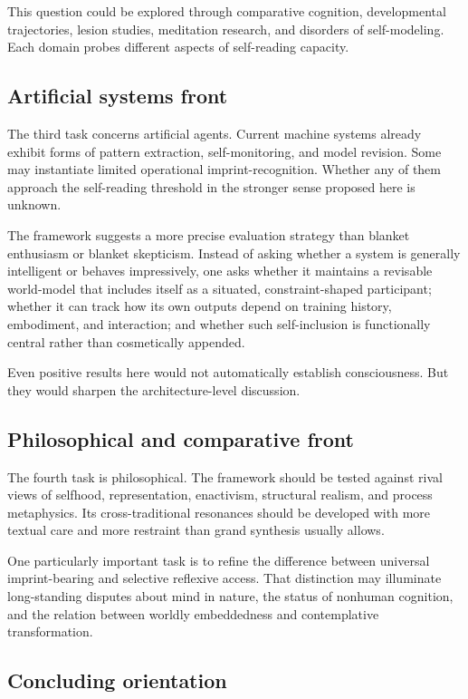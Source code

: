 \documentclass[12pt]{article}
\begin{document}
This question could be explored through comparative cognition, developmental trajectories, lesion studies, meditation research, and disorders of self-modeling. Each domain probes different aspects of self-reading capacity.

\subsection{Artificial systems front}

The third task concerns artificial agents. Current machine systems already exhibit forms of pattern extraction, self-monitoring, and model revision. Some may instantiate limited operational imprint-recognition. Whether any of them approach the self-reading threshold in the stronger sense proposed here is unknown.

The framework suggests a more precise evaluation strategy than blanket enthusiasm or blanket skepticism. Instead of asking whether a system is generally intelligent or behaves impressively, one asks whether it maintains a revisable world-model that includes itself as a situated, constraint-shaped participant; whether it can track how its own outputs depend on training history, embodiment, and interaction; and whether such self-inclusion is functionally central rather than cosmetically appended.

Even positive results here would not automatically establish consciousness. But they would sharpen the architecture-level discussion.

\subsection{Philosophical and comparative front}

The fourth task is philosophical. The framework should be tested against rival views of selfhood, representation, enactivism, structural realism, and process metaphysics. Its cross-traditional resonances should be developed with more textual care and more restraint than grand synthesis usually allows.

One particularly important task is to refine the difference between universal imprint-bearing and selective reflexive access. That distinction may illuminate long-standing disputes about mind in nature, the status of nonhuman cognition, and the relation between worldly embeddedness and contemplative transformation.

\subsection{Concluding orientation}
\end{document}

